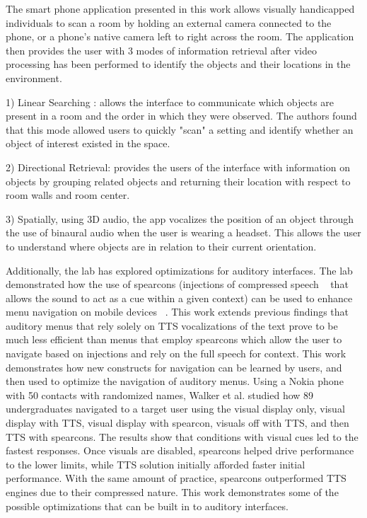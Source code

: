 The smart phone application presented in this work allows visually handicapped 
individuals to scan a room by holding an external camera connected to the phone, 
or a phone's native camera left to right across the room. The application then
provides the user with 3 modes of information retrieval after video processing 
has been performed to identify the objects and their locations in the environment.

1) Linear Searching : allows the interface to communicate which objects are
present in a room and the order in which they were observed.  The authors found
that this mode allowed users to quickly "scan" a setting and identify whether an 
object of interest existed in the space. 

2) Directional Retrieval: provides the users of the interface with information 
on objects by grouping related objects and returning their location with respect
to room walls and room center.

3) Spatially, using 3D audio, the app vocalizes the position of an object through
the use of binaural audio when the user is wearing a headset. This allows the user
to understand where objects are in relation to their current orientation.

Additionally, the lab has explored optimizations for auditory interfaces. The 
lab demonstrated how the use of spearcons (injections of compressed speech ~\cite{
jeon2009enhanced} that allows the sound to act as a cue within a given context)
can be used to enhance menu navigation on mobile devices ~\cite{
walker2009spearcon}. This work extends previous findings that auditory menus 
that rely solely on TTS vocalizations of the text prove to be much less efficient
than menus that employ spearcons which allow the user to navigate based on injections
and rely on the full speech for context.  This work demonstrates how new constructs 
for navigation can be learned by users, and then used to optimize the navigation
of auditory menus.  Using a Nokia phone with 50 contacts with randomized names,
Walker et al. studied how 89 undergraduates navigated to a target user using 
the visual display only, visual display with TTS, visual display with spearcon,
visuals off with TTS, and then TTS with spearcons. The results show that conditions
with visual cues led to the fastest responses.  Once visuals are disabled, spearcons
helped drive performance to the lower limits, while TTS solution initially afforded
faster initial performance.  With the same amount of practice, spearcons outperformed
TTS engines due to their compressed nature.  This work demonstrates some of the
possible optimizations that can be built in to auditory interfaces.

